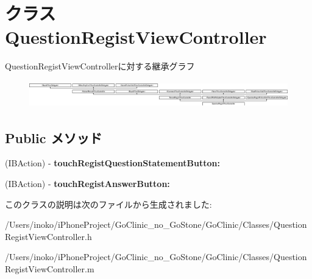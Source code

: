 \hypertarget{interface_question_regist_view_controller}{
\section{クラス QuestionRegistViewController}
\label{interface_question_regist_view_controller}
}
QuestionRegistViewControllerに対する継承グラフ\begin{figure}[H]
\begin{center}
\leavevmode
\includegraphics[height=1.185185cm]{interface_question_regist_view_controller}
\end{center}
\end{figure}
\subsection*{Public メソッド}
\begin{DoxyCompactItemize}
\item 
\hypertarget{interface_question_regist_view_controller_a3e148ea6d1a9c5e5415d5413d82e59fa}{
(IBAction) -\/ {\bfseries touchRegistQuestionStatementButton:}}
\label{interface_question_regist_view_controller_a3e148ea6d1a9c5e5415d5413d82e59fa}

\item 
\hypertarget{interface_question_regist_view_controller_a236261e70ca21480e12774649f236fb8}{
(IBAction) -\/ {\bfseries touchRegistAnswerButton:}}
\label{interface_question_regist_view_controller_a236261e70ca21480e12774649f236fb8}

\end{DoxyCompactItemize}


このクラスの説明は次のファイルから生成されました:\begin{DoxyCompactItemize}
\item 
/Users/inoko/iPhoneProject/GoClinic\_\-no\_\-GoStone/GoClinic/Classes/QuestionRegistViewController.h\item 
/Users/inoko/iPhoneProject/GoClinic\_\-no\_\-GoStone/GoClinic/Classes/QuestionRegistViewController.m\end{DoxyCompactItemize}
